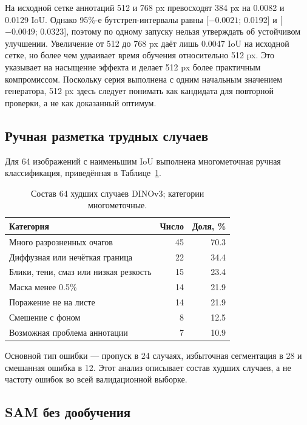 \documentclass[a4paper,12pt]{extarticle}
\begin{document}
На исходной сетке аннотаций 512 и 768 px превосходят 384 px на 0.0082 и
0.0129 IoU. Однако 95\%-е бутстреп-интервалы равны [$-0.0021$; 0.0192]
и [$-0.0049$; 0.0323], поэтому по одному запуску нельзя утверждать об
устойчивом улучшении. Увеличение от 512 до 768 px даёт лишь 0.0047 IoU на
исходной сетке, но более чем удваивает время обучения относительно 512 px.
Это указывает на насыщение эффекта и делает 512 px более практичным компромиссом.
Поскольку серия выполнена с одним начальным значением генератора, 512 px здесь
следует понимать как кандидата для повторной проверки, а не как доказанный
оптимум.

\subsection{Ручная разметка трудных случаев}

Для 64 изображений с наименьшим IoU выполнена многометочная ручная
классификация, приведённая в Таблице~\ref{tab:error-taxonomy}.

\begin{table}[ht]
  \caption{Состав 64 худших случаев DINOv3; категории многометочные.}
  \label{tab:error-taxonomy}
  \centering
  \small
  \begin{tabular}{lrr}
    \toprule
    Категория & Число & Доля, \% \\
    \midrule
    Много разрозненных очагов & 45 & 70.3 \\
    Диффузная или нечёткая граница & 22 & 34.4 \\
    Блики, тени, смаз или низкая резкость & 15 & 23.4 \\
    Маска менее 0.5\% & 14 & 21.9 \\
    Поражение не на листе & 14 & 21.9 \\
    Смешение с фоном & 8 & 12.5 \\
    Возможная проблема аннотации & 7 & 10.9 \\
    \bottomrule
  \end{tabular}
\end{table}

Основной тип ошибки --- пропуск в 24 случаях,
избыточная сегментация в 28 и смешанная ошибка в 12. Этот анализ описывает
состав худших случаев, а не частоту ошибок во всей валидационной выборке.

\subsection{SAM без дообучения}
\end{document}
